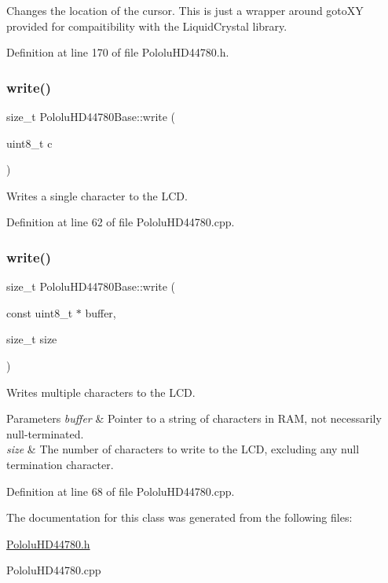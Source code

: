 Changes the location of the cursor. This is just a wrapper around goto\+XY provided for compaitibility with the Liquid\+Crystal library. 

Definition at line 170 of file Pololu\+H\+D44780.\+h.

\mbox{\label{class_pololu_h_d44780_base_a1aad3b3ce5820dc910174b3c91a5d65e}} 
\subsubsection{\texorpdfstring{write()}{write()}\hspace{0.1cm}{\footnotesize\ttfamily [1/2]}}
{\footnotesize\ttfamily size\+\_\+t Pololu\+H\+D44780\+Base\+::write (\begin{DoxyParamCaption}\item[{uint8\+\_\+t}]{c }\end{DoxyParamCaption})\hspace{0.3cm}{\ttfamily [virtual]}}

Writes a single character to the L\+CD. 

Definition at line 62 of file Pololu\+H\+D44780.\+cpp.

\mbox{\label{class_pololu_h_d44780_base_a965028ffd2313e9eaa968348effcab81}} 
\subsubsection{\texorpdfstring{write()}{write()}\hspace{0.1cm}{\footnotesize\ttfamily [2/2]}}
{\footnotesize\ttfamily size\+\_\+t Pololu\+H\+D44780\+Base\+::write (\begin{DoxyParamCaption}\item[{const uint8\+\_\+t $\ast$}]{buffer,  }\item[{size\+\_\+t}]{size }\end{DoxyParamCaption})\hspace{0.3cm}{\ttfamily [virtual]}}

Writes multiple characters to the L\+CD.


\begin{DoxyParams}{Parameters}
{\em buffer} & Pointer to a string of characters in R\+AM, not necessarily null-\/terminated. \\
\hline
{\em size} & The number of characters to write to the L\+CD, excluding any null termination character. \\
\hline
\end{DoxyParams}


Definition at line 68 of file Pololu\+H\+D44780.\+cpp.



The documentation for this class was generated from the following files\+:\begin{DoxyCompactItemize}
\item 
\hyperlink{_pololu_h_d44780_8h}{Pololu\+H\+D44780.\+h}\item 
Pololu\+H\+D44780.\+cpp\end{DoxyCompactItemize}
